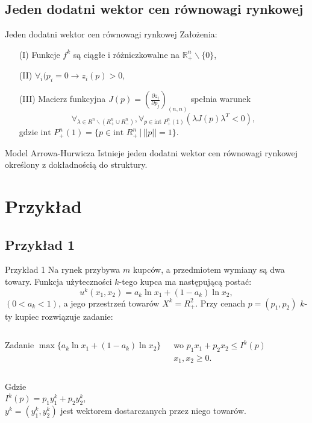 \documentclass[a4paper, 11pt]{beamer}
\begin{document}
    \subsection{Jeden dodatni wektor cen równowagi rynkowej}
      \begin{frame}{Jeden dodatni wektor cen równowagi rynkowej}
	Założenia:
	\begin{enumerate}
	  \item[(I)] Funkcje $f^k$ są ciągłe i różniczkowalne na
	  $\mathbb{R}^n_{+} \backslash \{0\}$,

	  \item[(II)] $\forall_i (p_i = 0 \rightarrow z_i (p) > 0$,

	  \item[(III)] Macierz funkcyjna $J(p) = (\frac{\partial z_i}{\partial
	  p_j})_{(n, n)}$ spełnia warunek
	    $$\forall_{\lambda \in R^n \backslash (R^n_{+} \cup R^n_{-})}, \forall_{p \in
	    \text{int }P^n_{+}(1)} (\lambda J(p) \lambda^T < 0),$$
	    gdzie $\text{int }P^n_{+}(1) = \{p\in\text{int }R^n_{+}\, \big|\,
	    ||p||=1 \}$.
	\end{enumerate}

	\begin{block}{Model Arrowa-Hurwicza}
	  Istnieje jeden dodatni wektor cen równowagi rynkowej określony z
	  dokładnością do struktury.
	\end{block}
      \end{frame}

  \section{Przykład}
    \subsection{Przykład 1}
    \begin{frame}{Przykład 1}
      Na rynek przybywa $m$ kupców, a przedmiotem wymiany są dwa towary. Funkcja
      użyteczności $k$-tego kupca ma następującą postać:
      \[ u^k(x_1, x_2)=a_k \ln x_1 +(1-a_k) \ln x_2, \]
      $(0 < a_k <1)$, a jego przestrzeń towarów $X^k = R^2_{+}$. Przy cenach
      $p=(p_1, p_2)$ $k$-ty kupiec rozwiązuje zadanie:

\begin{columns}[t]
      \begin{block}{Zadanie}
	$ \max \{ a_k \ln x_1 + (1-a_k) \ln x_2 \} $
      \end{block}
      \begin{block}{wo}
	$p_1x_1+p_2x_2 \leq I^k(p)$\\
	$x_1, x_2 \geq 0$.
      \end{block}
\end{columns}
	Gdzie\\
	$I^k(p)=p_1y_1^k + p_2y_2^k$,\\
	$y^k=(y^k_1,y^k_2)$ jest wektorem
	dostarczanych przez niego towarów.
    \end{frame}
\end{document}
